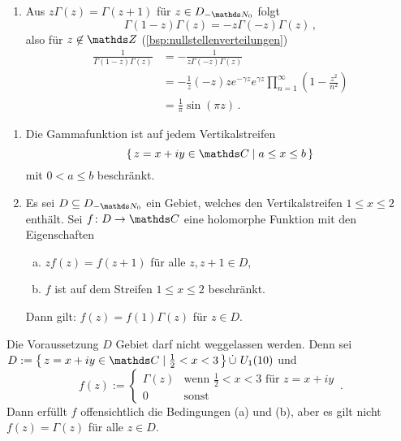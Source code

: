 \begin{bewe}
\begin{enumerate}
\item Aus $z\Gamma(z) = \Gamma(z+1)$ für $z\in D_{-\NN_0}$ folgt
\[
	\Gamma(1-z)\Gamma(z)
	= -z \Gamma(-z)\Gamma(z)
	\,,
\]
also für $z\not\in \ZZ$ (\autoref{bsp:nullstellenverteilungen})
\begin{align*}
	\frac{1}{\Gamma(1-z)\Gamma(z)}
	&= -\frac{1}{z\Gamma(-z)\Gamma(z)} \\
	&= -\frac{1}{z}(-z)ze^{-\gamma z}e^{\gamma z}\prod_{n=1}^\infty \left(1-\frac{z^2}{n^2}\right) \\
	&= \frac{1}{\pi} \sin(\pi z)
	\,.
\end{align*}
\end{enumerate}
\end{bewe}

\begin{satz}\label{satz:wielandt}\leavevmode
\begin{enumerate}
\item Die Gammafunktion ist auf jedem Vertikalstreifen
\[
	\Set{z=x+iy \in\CC \mid a \leq x \leq b}
\]
mit $0 < a \leq b$ beschränkt.

\item Es sei $D\subseteq D_{-\NN_0}$ ein Gebiet, welches den Vertikalstreifen $1 \leq x \leq 2$ enthält.
Sei $f\colon D\ra \CC$ eine holomorphe Funktion mit den Eigenschaften
\begin{enumerate}[(a)]
\item $zf(z) = f(z+1)$ für alle $z, z+1\in D$,
\item $f$ ist auf dem Streifen $1\leq x \leq 2$ beschränkt.
\end{enumerate}
Dann gilt:
$f(z) = f(1) \Gamma(z)$ für $z\in D$.
\end{enumerate}
\end{satz}

\begin{beme}
Die Voraussetzung $D$ Gebiet darf nicht weggelassen werden.
Denn sei $D := \Set{z = x+iy\in\CC \mid \frac{1}{2} < x < 3} \dot\cup\ U_1(10)$ und
\[
	f(z) :=
	\begin{cases}
		\Gamma(z) &\text{wenn } \frac{1}{2} < x < 3 \text{ für } z=x+iy \\
		0 &\text{sonst}
	\end{cases}
	\,.
\]
Dann erfüllt $f$ offensichtlich die Bedingungen (a) und (b), aber es gilt nicht $f(z) = \Gamma(z)$ für alle $z\in D$.
\end{beme}

